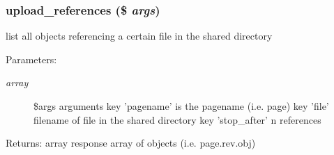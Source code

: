 \hypertarget{module__glue_8inc_8php_2099347b9bdf5a5973a13e5f7a4be933}{
\subsubsection[{upload\_\-references}]{\setlength{\rightskip}{0pt plus 5cm}upload\_\-references (\$ {\em args})}}
\label{module__glue_8inc_8php_2099347b9bdf5a5973a13e5f7a4be933}


list all objects referencing a certain file in the shared directory

\begin{Desc}
\item[Parameters:]
\begin{description}
\item[{\em array}]\$args arguments key 'pagename' is the pagename (i.e. page) key 'file' filename of file in the shared directory key 'stop\_\-after' n references \end{description}
\end{Desc}
\begin{Desc}
\item[Returns:]array response array of objects (i.e. page.rev.obj) \end{Desc}
